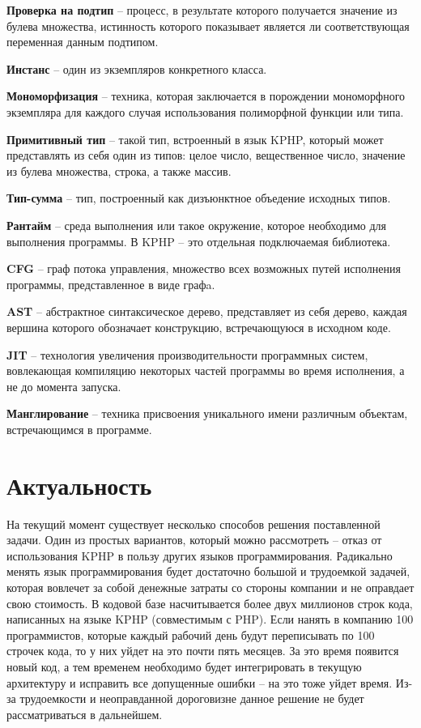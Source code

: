 \textbf{Проверка на подтип} -- процесс, в результате которого получается значение из булева множества, истинность которого показывает является ли соответствующая переменная данным подтипом.

\textbf{Инстанс} -- один из экземпляров конкретного класса.

\textbf{Мономорфизация} -- техника, которая заключается в порождении мономорфного экземпляра для каждого случая использования полиморфной функции или типа.

\textbf{Примитивный тип} -- такой тип, встроенный в язык KPHP, который может представлять из себя один из типов: целое число, вещественное число, значение из булева множества, строка, а также массив.

\textbf{Тип-сумма} -- тип, построенный как дизъюнктное объедение исходных типов.

\textbf{Рантайм} -- среда выполнения или такое окружение, которое необходимо для выполнения программы. В KPHP -- это отдельная подключаемая библиотека.

\textbf{CFG} -- граф потока управления, множество всех возможных путей исполнения программы, представленное в виде графa.

\textbf{AST} -- абстрактное синтаксическое дерево, представляет из себя дерево, каждая вершина которого обозначает конструкцию, встречающуюся в исходном коде.

\textbf{JIT} -- технология увеличения производительности программных систем, вовлекающая компиляцию некоторых частей программы во время исполнения, а не до момента запуска.

\textbf{Манглирование} -- техника присвоения уникального имени различным объектам, встречающимся в программе.

\section{Актуальность}
\label{sec:actuality}
На текущий момент существует несколько способов решения поставленной задачи.
Один из простых вариантов, который можно рассмотреть -- отказ от использования KPHP в пользу других языков программирования.
Радикально менять язык программирования будет достаточно большой и трудоемкой задачей, которая вовлечет за собой денежные затраты со стороны компании и не оправдает свою стоимость.
В кодовой базе насчитывается более двух миллионов строк кода, написанных на языке KPHP (совместимым с PHP).
Если нанять в компанию 100 программистов, которые каждый рабочий день будут переписывать по 100 строчек кода, то у них уйдет на это почти пять месяцев.
За это время появится новый код, а тем временем необходимо будет интегрировать в текущую архитектуру и исправить все допущенные ошибки -- на это тоже уйдет время.
Из-за трудоемкости и неоправданной дороговизне данное решение не будет рассматриваться в дальнейшем.

